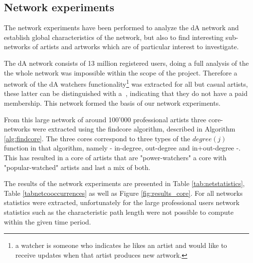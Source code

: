 \subsection{Network experiments}
The network experiments have been performed to analyze the dA network and establish global characteristics of the network, but also to find interesting sub-networks of artists and artworks which are of particular interest to investigate.

The dA network consists of 13 million registered users, doing a full analysis of the the whole network was impossible within the scope of the project. Therefore a network of the dA watchers functionality\footnote{a watcher is someone who indicates he likes an artist and would like to receive updates when that artist produces new artwork.} was extracted for all but casual artists, these latter can be distinguished with a $~$, indicating that they do not have a paid membership. This network formed the basis of our network experiments.

From this large network of around 100'000 professional artists three core-networks were extracted using the findcore algorithm, described in Algorithm \ref{alg:findcore}. The three cores correspond to three types of the $degree(j)$ function in that algorithm, namely - in-degree, out-degree and in+out-degree -. This has resulted in a core of artists that are "power-watchers" a core with "popular-watched" artists and last a mix of both.

The results of the network experiments are presented in Table \ref{tab:netstatistics}, Table \ref{tabnetcooccurrences} as well as Figure \ref{fig:results_core}.  For all networks statistics were extracted, unfortunately for the large professional users network statistics such as the characteristic path length were not possible to compute within the given time period.

